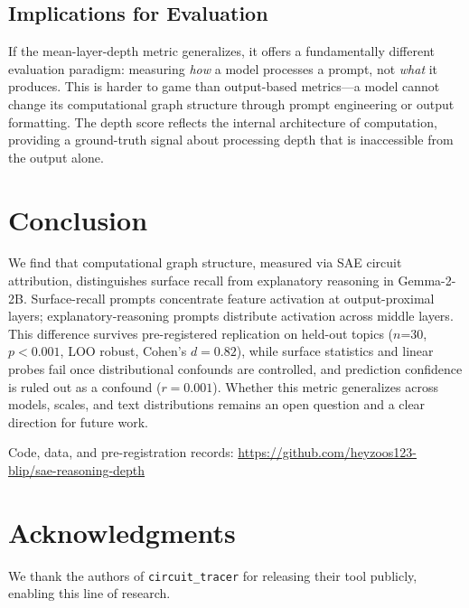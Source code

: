 \documentclass{article}
\begin{document}
\subsection{Implications for Evaluation}

If the mean-layer-depth metric generalizes, it offers a fundamentally different evaluation 
paradigm: measuring \textit{how} a model processes a prompt, not \textit{what} it produces. 
This is harder to game than output-based metrics---a model cannot change its computational 
graph structure through prompt engineering or output formatting. The depth score reflects 
the internal architecture of computation, providing a ground-truth signal about processing 
depth that is inaccessible from the output alone.

\section{Conclusion}

We find that computational graph structure, measured via SAE circuit attribution, 
distinguishes surface recall from explanatory reasoning in Gemma-2-2B. Surface-recall 
prompts concentrate feature activation at output-proximal layers; explanatory-reasoning 
prompts distribute activation across middle layers. This difference survives pre-registered 
replication on held-out topics ($n$=30, $p < 0.001$, LOO robust, Cohen's $d = 0.82$), 
while surface statistics and linear probes fail once distributional confounds are controlled, 
and prediction confidence is ruled out as a confound ($r = 0.001$). Whether this metric 
generalizes across models, scales, and text distributions remains an open question and a 
clear direction for future work.

Code, data, and pre-registration records:
\url{https://github.com/heyzoos123-blip/sae-reasoning-depth}

\section*{Acknowledgments}

We thank the authors of \texttt{circuit\_tracer} for releasing their tool publicly, enabling 
this line of research.
\end{document}
